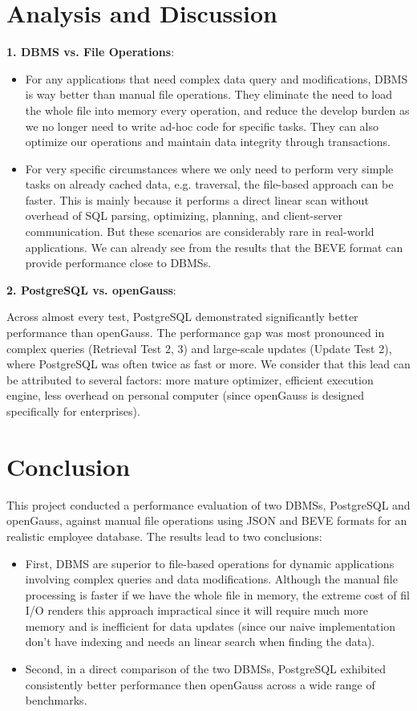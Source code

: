 \documentclass[14pt,a4paper]{article}
\begin{document}
    \section{Analysis and Discussion}
    \textbf{1. DBMS vs. File Operations}:
    \begin{itemize}
        \item For any applications that need complex data query and modifications, DBMS is way better than manual file operations. They eliminate the need to load the whole file into memory every operation, and reduce the develop burden as we no longer need to write ad-hoc code for specific tasks. They can also optimize our operations and maintain data integrity through transactions.
        \item For very specific circumstances where we only need to perform very simple tasks on already cached data, e.g. traversal, the file-based approach can be faster. This is mainly because it performs a direct linear scan without overhead of SQL parsing, optimizing, planning, and client-server communication. But these scenarios are considerably rare in real-world applications. We can already see from the results that the BEVE format can provide performance close to DBMSs.
    \end{itemize}    
    \textbf{2. PostgreSQL vs. openGauss}:    
    
    Across almost every test, PostgreSQL demonstrated significantly better performance than openGauss. The performance gap was most pronounced in complex queries (Retrieval Test 2, 3) and large-scale updates (Update Test 2), where PostgreSQL was often twice as fast or more. We consider that this lead can be attributed to several factors: more mature optimizer, efficient execution engine, less overhead on personal computer (since openGauss is designed specifically for enterprises).
    
    \section{Conclusion}
    
    This project conducted a performance evaluation of two DBMSs, PostgreSQL and openGauss, against manual file operations using JSON and BEVE formats for an realistic employee database. The results lead to two conclusions:
    \begin{itemize}
        \item First, DBMS are superior to file-based operations for dynamic applications involving complex queries and data modifications. Although the manual file processing is faster if we have the whole file in memory, the extreme cost of fil I/O renders this approach impractical since it will require much more memory and is inefficient for data updates (since our naive implementation don't have indexing and needs an linear search when finding the data).
        \item Second, in a direct comparison of the two DBMSs, PostgreSQL exhibited consistently better performance then openGauss across a wide range of benchmarks.
    \end{itemize}
    
\end{document}
